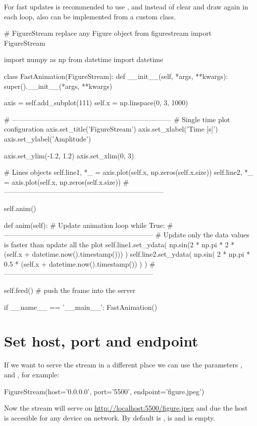 For fast updates is recommended to use ,  and  instead of clear and draw again in each loop, also  can be implemented from a custom class.

\begin{python}
# FigureStream replace any Figure object
from figurestream import FigureStream

import numpy as np
from datetime import datetime


class FastAnimation(FigureStream):
    def __init__(self, *args, **kwargs):
        super().__init__(*args, **kwargs)

        axis = self.add_subplot(111)
        self.x = np.linspace(0, 3, 1000)

        # ---------------------------------------------------------------------
        # Single time plot configuration
        axis.set_title('FigureStream')
        axis.set_xlabel('Time [s]')
        axis.set_ylabel('Amplitude')

        axis.set_ylim(-1.2, 1.2)
        axis.set_xlim(0, 3)

        # Lines objects
        self.line1, *_ = axis.plot(self.x, np.zeros(self.x.size))
        self.line2, *_ = axis.plot(self.x, np.zeros(self.x.size))
        # ---------------------------------------------------------------------

        self.anim()

    def anim(self):
        # Update animation loop
        while True:
            # -----------------------------------------------------------------
            # Update only the data values is faster than update all the plot
            self.line1.set_ydata(
                np.sin(2 * np.pi * 2 * (self.x + datetime.now().timestamp()))
            )
            self.line2.set_ydata(
                np.sin(
                    2 * np.pi * 0.5 * (self.x + datetime.now().timestamp())
                )
            )
            # -----------------------------------------------------------------

            self.feed()  # push the frame into the server


if __name__ == '__main__':
    FastAnimation()

\end{python}

\section{Set host, port and endpoint}
If we want to serve the stream in a different place we can use the parameters ,  and , for example:
\begin{python}
FigureStream(host='0.0.0.0', port='5500', endpoint='figure.jpeg')
\end{python}

Now the stream will serve on \url{http://localhost:5500/figure.jpeg} and due the  host is accesible for any device on network.
By default  is ,  is  and  is empty.
